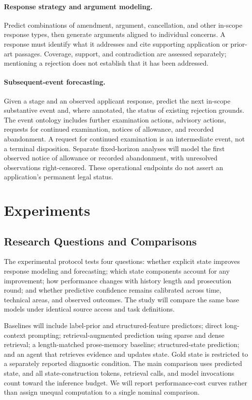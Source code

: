 \documentclass[11pt]{article}
\begin{document}
\paragraph{Response strategy and argument modeling.}
Predict combinations of amendment, argument, cancellation, and other in-scope response types, then generate arguments aligned to individual concerns. A response must identify what it addresses and cite supporting application or prior-art passages. Coverage, support, and contradiction are assessed separately; mentioning a rejection does not establish that it has been addressed.

\paragraph{Subsequent-event forecasting.}
Given a stage and an observed applicant response, predict the next in-scope substantive event and, where annotated, the status of existing rejection grounds. The event ontology includes further examination actions, advisory actions, requests for continued examination, notices of allowance, and recorded abandonment. A request for continued examination is an intermediate event, not a terminal disposition. Separate fixed-horizon analyses will model the first observed notice of allowance or recorded abandonment, with unresolved observations right-censored. These operational endpoints do not assert an application's permanent legal status.

\section{Experiments}
\label{sec:exp}

\subsection{Research Questions and Comparisons}
\label{sec:exp-questions}

The experimental protocol tests four questions: whether explicit state improves response modeling and forecasting; which state components account for any improvement; how performance changes with history length and prosecution round; and whether predictive confidence remains calibrated across time, technical areas, and observed outcomes. The study will compare the same base models under identical source access and task definitions.

Baselines will include label-prior and structured-feature predictors; direct long-context prompting; retrieval-augmented prediction using sparse and dense retrieval; a length-matched prose-memory baseline; structured-state prediction; and an agent that retrieves evidence and updates state. Gold state is restricted to a separately reported diagnostic condition. The main comparison uses predicted state, and all state-construction tokens, retrieval calls, and model invocations count toward the inference budget. We will report performance-cost curves rather than assign unequal computation to a single nominal comparison.
\end{document}
